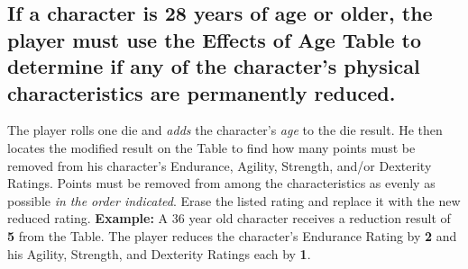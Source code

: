 \begin{table}[htbp]
  \centering
\end{table}


\subsection[Effects of Age]{If a character is 28 years of age or
  older, the player 
  must use the Effects of Age Table to determine if any of the
  character's physical characteristics are permanently reduced.}
\label{sec:if-character-28}

The player rolls one die and \emph{adds} the character's \emph{age} to
the die result. He then locates the modified result on the Table to
find how many points must be removed from his character's
Endurance,
Agility,
Strength,
and/or Dexterity Ratings. Points must be removed from among the
characteristics as evenly as possible \emph{in the order indicated}.
Erase the listed rating and replace it with the new reduced rating.
\textbf{Example:} A 36 year old character receives a reduction result
of \textbf{5} from the Table. The player reduces the character's
Endurance Rating by \textbf{2} and his Agility, Strength, and
Dexterity Ratings each by \textbf{1}.

